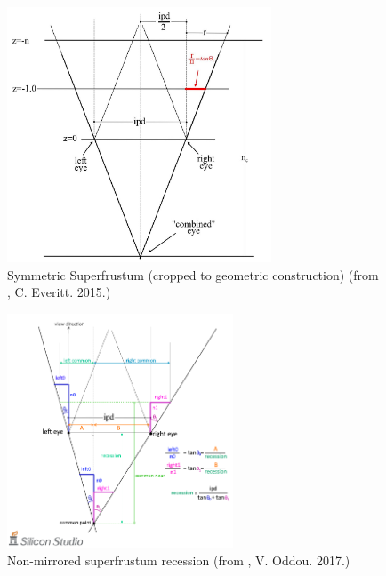 \begin{figure}[htb]
  \centering
  \includegraphics[width=0.7\textwidth]{pictures/Everitt_Superfrustum_Crop}
  \caption{Symmetric Superfrustum (cropped to geometric construction) (from \cite{Everitt.2015}, C. Everitt. 2015.)} \label{fig:Everitt_Superfrustum}
\end{figure}

\begin{figure}[htb]
  \centering
  \includegraphics[width=0.6\textwidth]{pictures/Oddou_Asymmetry}
  \caption{Non-mirrored superfrustum recession (from \cite{Oddou.23.05.2017}, V. Oddou. 2017.)} \label{fig:Oddou_Asymmetry}
\end{figure}

